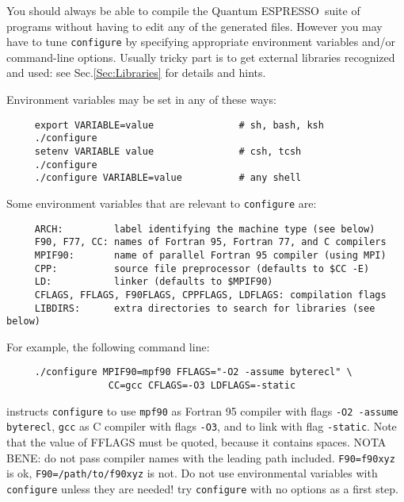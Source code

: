 \documentclass[12pt,a4paper]{article}
\def\qe{{\sc Quantum ESPRESSO}}
\begin{document}
You should always be able to compile the \qe\ suite
of programs without having to edit any of the generated files. However you
may have to tune \texttt{configure} by specifying appropriate environment variables
and/or command-line options. Usually tricky part is to get external
libraries recognized and used: see Sec.\ref{Sec:Libraries}
for details and hints.

Environment variables may be set in any of these ways:
\begin{verbatim}
     export VARIABLE=value               # sh, bash, ksh
     ./configure
     setenv VARIABLE value               # csh, tcsh
     ./configure
     ./configure VARIABLE=value          # any shell
\end{verbatim}
Some environment variables that are relevant to \texttt{configure} are:
\begin{verbatim}
     ARCH:         label identifying the machine type (see below)
     F90, F77, CC: names of Fortran 95, Fortran 77, and C compilers
     MPIF90:       name of parallel Fortran 95 compiler (using MPI)
     CPP:          source file preprocessor (defaults to $CC -E)
     LD:           linker (defaults to $MPIF90)
     CFLAGS, FFLAGS, F90FLAGS, CPPFLAGS, LDFLAGS: compilation flags
     LIBDIRS:      extra directories to search for libraries (see below)
\end{verbatim}
For example, the following command line:
\begin{verbatim}
     ./configure MPIF90=mpf90 FFLAGS="-O2 -assume byterecl" \
                  CC=gcc CFLAGS=-O3 LDFLAGS=-static
\end{verbatim}
instructs \texttt{configure} to use \texttt{mpf90} as Fortran 95 compiler 
with flags \texttt{-O2 -assume byterecl}, \texttt{gcc} as C compiler with 
flags \texttt{-O3}, and to link with flag \texttt{-static}. 
Note that the value of FFLAGS must be quoted, because it contains
spaces. NOTA BENE: do not pass compiler names with the leading path
included. \texttt{F90=f90xyz} is ok, \texttt{F90=/path/to/f90xyz} is not. 
Do not use
environmental variables with \texttt{configure} unless they are needed! try
\texttt{configure} with no options as a first step.
\end{document}
